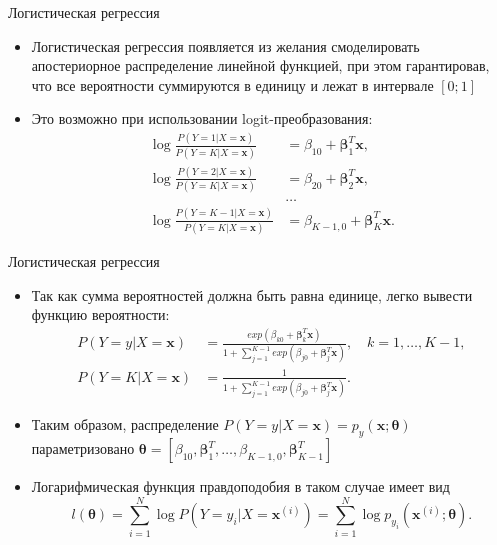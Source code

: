 \documentclass{beamer}
\begin{document}
\begin{frame}{Логистическая регрессия}
    \small

    \begin{itemize}
        \item Логистическая регрессия появляется из желания смоделировать апостериорное распределение линейной функцией, при этом гарантировав, что все вероятности суммируются в единицу и лежат в интервале $[0; 1]$
        \item Это возможно при использовании logit-преобразования:
        \begin{align*}
          \log \frac{P(Y = 1 | X = \bm{x})}{P(Y = K | X = \bm{x})} &= \beta_{10} + \bm{\beta}_1^T \bm{x}, \\
          \log \frac{P(Y = 2 | X = \bm{x})}{P(Y = K | X = \bm{x})} &= \beta_{20} + \bm{\beta}_2^T \bm{x}, \\
          &\dots \\
          \log \frac{P(Y = K - 1 | X = \bm{x})}{P(Y = K | X = \bm{x})} &= \beta_{K-1, 0} + \bm{\beta}_K^T \bm{x}.
        \end{align*}
    \end{itemize}
\end{frame}

\begin{frame}{Логистическая регрессия}
    \small

    \begin{itemize}
        \item Так как сумма вероятностей должна быть равна единице, легко вывести функцию вероятности:
        \begin{align*}
          P(Y = y | X = \bm{x}) &= \frac{exp(\beta_{k0} + \bm{\beta}_k^T \bm{x})}{1 + \sum_{j=1}^{K-1} exp(\beta_{j0} + \bm{\beta}_j^T \bm{x})}, \quad k = 1, \dots, K - 1, \\
          P(Y = K | X = \bm{x}) &= \frac{1}{1 + \sum_{j=1}^{K-1} exp(\beta_{j0} + \bm{\beta}_j^T \bm{x})}.
        \end{align*}
        \item Таким образом, распределение $P(Y = y | X = \bm{x}) = p_y(\bm{x}; \bm{\theta})$ параметризовано $\bm{\theta} = [\beta_{10}, \bm{\beta}_1^T, \dots, \beta_{K-1,0}, \bm{\beta}_{K-1}^T]$
        \item Логарифмическая функция правдоподобия в таком случае имеет вид
        \begin{equation}
            l(\bm{\theta}) = \sum_{i=1}^N \log P(Y = y_i | X = \bm{x}^{(i)}) = \sum_{i=1}^N \log p_{y_i}(\bm{x}^{(i)}; \bm{\theta}).
        \end{equation}
    \end{itemize}
\end{frame}
\end{document}
